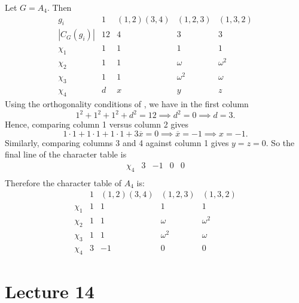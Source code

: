 \documentclass[11pt, notitlepage]{article}
\numberwithin{equation}{section}
\theoremstyle{plain}
\theoremstyle{definition}
\newenvironment{example}
	{\pushQED{\qed}\renewcommand{\qedsymbol}{$\blacktriangleleft$}\examplex}
	{\popQED\endexamplex}
\begin{document}
\begin{example}
Let $G = A_4$. Then
\[
    \begin{array}{c|cccc}
        g_i        & 1  & (1,2)(3,4) & (1,2,3)  & (1,3,2)  \\\hline
        |C_G(g_i)| & 12 &      4     &    3     &    3\\\hline
        \chi_1     & 1  &      1     &    1     &    1\\
        \chi_2     & 1  &      1     &  \omega  &  \omega^2\\
        \chi_3     & 1  &      1     & \omega^2 &  \omega\\
        \chi_4     & d  &      x     &    y    &    z
    \end{array}
\]
Using the orthogonality conditions of , we have in the first column
\[
    1^2 + 1^2 + 1^2 + d^2 = 12 \implies d^2 = 0 \implies d = 3.
\]
Hence, comparing column 1 versus column 2 gives
\[
    1 \cdot 1 + 1 \cdot 1 + 1 \cdot 1 + 3\overline x = 0 \implies \overline x = -1 \implies x = -1.
\]
Similarly, comparing columns 3 and 4 against column 1 gives $y = z = 0$. So the final line of the character table is
\[
    \begin{array}{c|clcc}
        \chi_4 & 3 & -1 & 0 & 0  \\
    \end{array}
\]
Therefore the character table of $A_4$ is:
\[
    \begin{array}{c|cccc}
                   & 1  & (1,2)(3,4) & (1,2,3)  & (1,3,2)  \\\hline
        \chi_1     & 1  &      1     &    1     &    1\\
        \chi_2     & 1  &      1     &  \omega  &  \omega^2\\
        \chi_3     & 1  &      1     & \omega^2 &  \omega\\
        \chi_4     & 3  &     -1     &    0     &    0
    \end{array}
\]
\end{example}















\section{Lecture 14}
\end{document}
